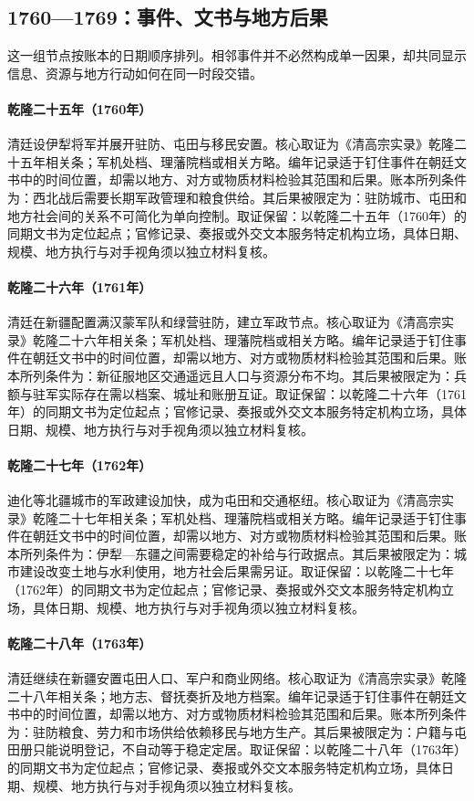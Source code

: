 \subsection{1760—1769：事件、文书与地方后果}
这一组节点按账本的日期顺序排列。相邻事件并不必然构成单一因果，却共同显示信息、资源与地方行动如何在同一时段交错。
\hypertarget{ledger:EQ-1760-ILI-GENERAL}{}\paragraph{乾隆二十五年（1760年）}清廷设伊犁将军并展开驻防、屯田与移民安置。核心取证为《清高宗实录》乾隆二十五年相关条；军机处档、理藩院档或相关方略。编年记录适于钉住事件在朝廷文书中的时间位置，却需以地方、对方或物质材料检验其范围和后果。账本所列条件为：西北战后需要长期军政管理和粮食供给。其后果被限定为：驻防城市、屯田和地方社会间的关系不可简化为单向控制。取证保留：以乾隆二十五年（1760年）的同期文书为定位起点；官修记录、奏报或外交文本服务特定机构立场，具体日期、规模、地方执行与对手视角须以独立材料复核。
\hypertarget{ledger:EQ-1761-XINJIANG-GARRISONS}{}\paragraph{乾隆二十六年（1761年）}清廷在新疆配置满汉蒙军队和绿营驻防，建立军政节点。核心取证为《清高宗实录》乾隆二十六年相关条；军机处档、理藩院档或相关方略。编年记录适于钉住事件在朝廷文书中的时间位置，却需以地方、对方或物质材料检验其范围和后果。账本所列条件为：新征服地区交通遥远且人口与资源分布不均。其后果被限定为：兵额与驻军实际存在需以档案、城址和账册互证。取证保留：以乾隆二十六年（1761年）的同期文书为定位起点；官修记录、奏报或外交文本服务特定机构立场，具体日期、规模、地方执行与对手视角须以独立材料复核。
\hypertarget{ledger:EQ-1762-URUMQI-FOUNDATION}{}\paragraph{乾隆二十七年（1762年）}迪化等北疆城市的军政建设加快，成为屯田和交通枢纽。核心取证为《清高宗实录》乾隆二十七年相关条；军机处档、理藩院档或相关方略。编年记录适于钉住事件在朝廷文书中的时间位置，却需以地方、对方或物质材料检验其范围和后果。账本所列条件为：伊犁—东疆之间需要稳定的补给与行政据点。其后果被限定为：城市建设改变土地与水利使用，地方社会后果需另证。取证保留：以乾隆二十七年（1762年）的同期文书为定位起点；官修记录、奏报或外交文本服务特定机构立场，具体日期、规模、地方执行与对手视角须以独立材料复核。
\hypertarget{ledger:EQ-1763-XINJIANG-SETTLEMENT}{}\paragraph{乾隆二十八年（1763年）}清廷继续在新疆安置屯田人口、军户和商业网络。核心取证为《清高宗实录》乾隆二十八年相关条；地方志、督抚奏折及地方档案。编年记录适于钉住事件在朝廷文书中的时间位置，却需以地方、对方或物质材料检验其范围和后果。账本所列条件为：驻防粮食、劳力和市场供给依赖移民与地方生产。其后果被限定为：户籍与屯田册只能说明登记，不自动等于稳定定居。取证保留：以乾隆二十八年（1763年）的同期文书为定位起点；官修记录、奏报或外交文本服务特定机构立场，具体日期、规模、地方执行与对手视角须以独立材料复核。

